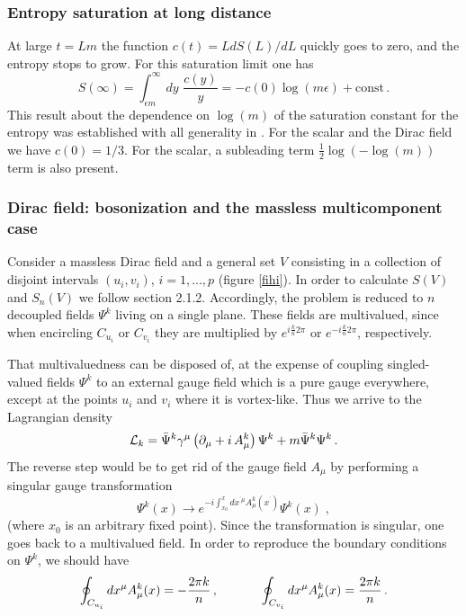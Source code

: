 \documentclass[a4paper]{article}
\begin{document}
\subsubsection{Entropy saturation at long distance}
 At large $t=L m$ the function $c(t)=L d S(L)/dL$ quickly goes to zero, and the entropy stops to grow. For this saturation limit one has
\begin{equation}
S(\infty)=\int_{\epsilon m}^\infty dy \,\,\frac{c(y)}{y} =-c(0) \log(m \epsilon)+\textrm{const}\,.
\end{equation}
This result about the dependence on $\log (m)$ of the saturation constant for the entropy was established with all generality in \cite{cc}. For the scalar and the Dirac field we have $c(0)=1/3$. For the scalar, a subleading term $\frac{1}{2}\log(-\log(m))$ term is also present.



\subsubsection{Dirac field: bosonization and the massless multicomponent case}

Consider a massless Dirac field and a general set $V$ consisting in a collection of
disjoint intervals $ (u_{i},v_{i})$, $i=1,...,p$ (figure \ref{fihi}).
 In order to calculate $S(V)$ and $S_n(V)$ we follow section 2.1.2.  Accordingly, the problem is reduced to $n$ decoupled
fields $\Psi^{k}$ living on a single plane. These fields are multivalued,
since when encircling $C_{u_{i}}$ or $C_{v_{i}}$ they are multiplied
by $e^{i\frac{k}{n}2\pi }$ or $e^{-i\frac{k}{n}2\pi }$, respectively.

That multivaluedness can be disposed of, at the expense of
coupling singled-valued fields $\Psi^{k}$ to an external gauge
field which is a pure gauge everywhere, except at the points $u_{i}$ and
$v_{i}$ where it is vortex-like. Thus we arrive to the Lagrangian density
\begin{equation}
{\cal L}_{k}=\bar{\Psi}^{k}\gamma ^{\mu }\left( \partial _{\mu }+i\,A_{\mu
}^{k}\right) \Psi ^{k}+m\bar{\Psi}^{k}\Psi ^{k}\,.
\end{equation}
The reverse step would be to get rid of the gauge field $A_{\mu }$
by performing a singular gauge transformation 
\begin{equation}
\Psi^{k}(x)\to e^{-i\int_{x_{0}}^{x}dx^{^{\prime }\mu }A_{\mu }^{k}(x^{^{\prime }})}\Psi
^{k}\left( x\right) \;,
\end{equation}
(where $x_{0}$ is an arbitrary fixed point). Since the transformation
is singular, one goes back to a multivalued field. In order to reproduce the boundary conditions on $\Psi^{k}$,
we should have 
\begin{equation}
\oint_{C_{u_{i}}}dx^{\mu }A_{\mu }^{k}(x) =-\frac{2 \pi k}{n} \,,  
\hspace{1.2cm}
\oint_{C_{v_{i}}}dx^{\mu }A_{\mu }^{k}(x) =\frac{2 \pi k}{n} \,.
\label{90}
\end{equation}
\end{document}
